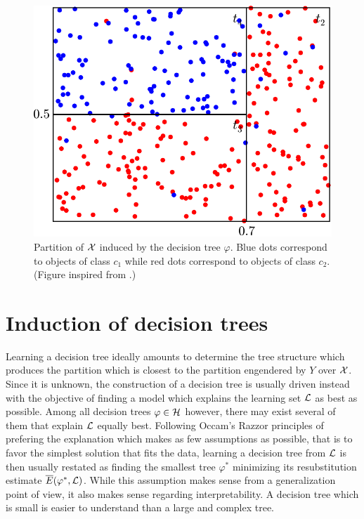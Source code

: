 \begin{figure}
    \centering
    \includegraphics[scale=0.5]{figures/ch3_partition.pdf}
    \caption{Partition of ${\cal X}$ induced by the decision tree $\varphi$.
             Blue dots correspond to objects of class $c_1$ while red dots correspond
             to objects of class $c_2$. (Figure inspired from \citet{breiman:1984}.)}
    \label{fig:3:partition}
\end{figure}


\section{Induction of decision trees}
\label{sec:3:induction}

Learning a decision tree ideally amounts to determine the tree structure which
produces the partition which is closest to the partition engendered by $Y$ over
${\cal X}$. Since it is unknown, the construction of a decision tree is usually
driven instead with the objective of finding a model which explains the
learning set ${\cal L}$ as best as possible. Among all decision trees $\varphi
\in {\cal H}$ however, there may exist several of them that explain ${\cal L}$
equally best. Following Occam's Razzor principles of prefering the explanation
which makes as few assumptions as possible, that is to favor the simplest
solution that fits the data, learning a decision tree from ${\cal L}$ is then
usually restated as finding the smallest tree $\varphi^*$ minimizing its
resubstitution estimate $\overline{E}(\varphi^*, {\cal L})$. While this
assumption makes sense from a generalization point of view, it also makes
sense regarding interpretability. A decision tree which is small is easier
to understand than a large and complex tree.

